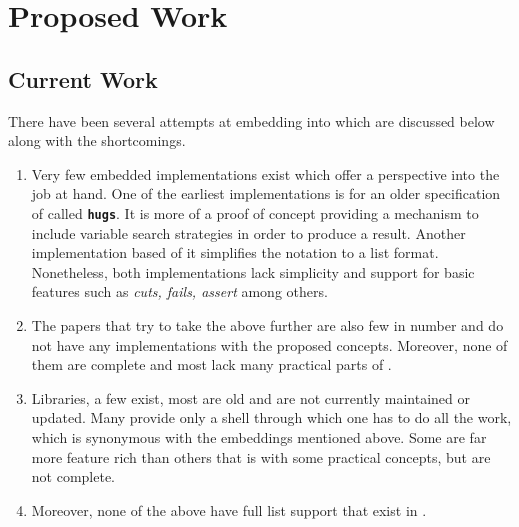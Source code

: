\documentclass[thesis-solanki.tex]{subfiles}
\begin{document}
\chapter{Proposed Work}\label{chap:proposedWork}
\section{Current Work}

There have been several attempts at embedding  into  which are discussed below along with the 
shortcomings.

\begin{enumerate}
\item Very few embedded implementations exist which offer a perspective into the job at hand. One of the earliest implementations 
\cite{website:mini-prolog-hugs98} is for an older specification of  called  
\texttt{\bfseries{hugs}}. It is more of a proof of concept providing a mechanism to include variable search strategies in order to produce 
a result. Another implementation \cite{website:takashi-workplace} based of it simplifies the notation to a list format. Nonetheless, both 
implementations lack simplicity and support for basic  features such as \textit{cuts, fails, assert} among others.   

\begin{comment}
\item Only two embeddings exist, one of them is old and made for \texttt{\bfseries{hugs}} a functional programming system based on the 
\progLang{Haskell 98} specification. It is complex and also lacks a lot of \progLang{Prolog} like features including \textit{cuts, fails, 
assert} among others. The second one is based off the first one to make it simple but it loses the variable search strategy support which 
allows the programmer to choose the manner in which a solution is produced. 
\end{comment}

\item The papers that try to take the above further are also few in number and do not have any implementations with the proposed 
concepts. Moreover, none of them are complete and most lack many practical parts of .

\item Libraries, a few exist, most are old and are not currently maintained or updated. Many provide only a shell through which one has to do all the work, 
which is synonymous with the embeddings mentioned above. Some are far more feature rich than others that is with some practical  
concepts, but are not complete.

\item Moreover, none of the above have full list support that exist in .
\end{enumerate}
\end{document}
